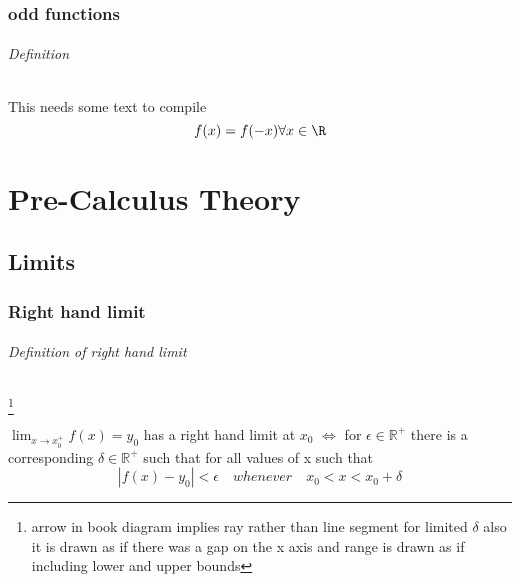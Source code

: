 \documentclass[12pt, a4paper,oneside]{book}
\begin{document}
         	 \section{ odd functions} 
               \paragraph{Definition}
              \begin{paragraph}
             { This needs some text to compile
               \[f(x)=f(-x) \forall x \in \R \]}
          		\end{paragraph}


















\part{Pre-Calculus Theory}
\chapter{Limits}
\section{Right hand limit}
\paragraph{Definition of right hand limit}\footnote{arrow in book diagram implies ray rather than line segment for limited \( \delta\) also it is drawn as if there was a gap on the x axis and range is drawn as if including lower and upper bounds}

\( \lim_{x \to x_0^+}f(x) = y_0 \) has a right hand limit at \(x_0\) \(\Leftrightarrow\) for \( \epsilon \in \mathbb{R^+} \) there is a corresponding \( \delta \in \mathbb{R^+} \) such that for all values of x  such that \[|f(x) - y_0| <\epsilon \quad whenever \quad x_0 < x < x_0+\delta\]

\end{document}
